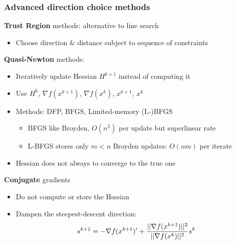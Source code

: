 \documentclass[bigger]{beamer}
\begin{document}
\begin{frame}%

\frametitle{Advanced direction choice methods}

\textbf{Trust Region} methods: alternative to line search
\begin{itemize}
\item Choose direction $\&$ distance subject to sequence of constraints
\end{itemize}

\textbf{Quasi-Newton} methods:

\begin{itemize}
\item Iteratively update Hessian $H^{k+1}$ instead of computing it

\item Use $H^{k}$, $\nabla f(x^{k+1})$, $\nabla f(x^{k})$, $x^{k+1}$, $x^{k}$

\item Methods: DFP, BFGS, Limited-memory (L-)BFGS 

\begin{itemize}
\item BFGS like Broyden, $O(n^2)$ per update but superlinear rate
\item L-BFGS stores only $m<n$ Broyden updates: $O(nm)$ per iterate
\end{itemize}

\item Hessian does not always to converge to the true one
\end{itemize}

\textbf{Conjugate} gradients

\begin{itemize}
\item Do not compute or store the Hessian

\item Dampen the steepest-descent direction:%
\begin{equation*}
s^{k+1}=-\nabla f(x^{k+1})^{\prime }+\frac{||\nabla f(x^{k+1})||^{2}}{%
||\nabla f(x^{k})||^{2}}s^{k}
\end{equation*}

% 


\end{itemize}


\end{frame}%
\end{document}
